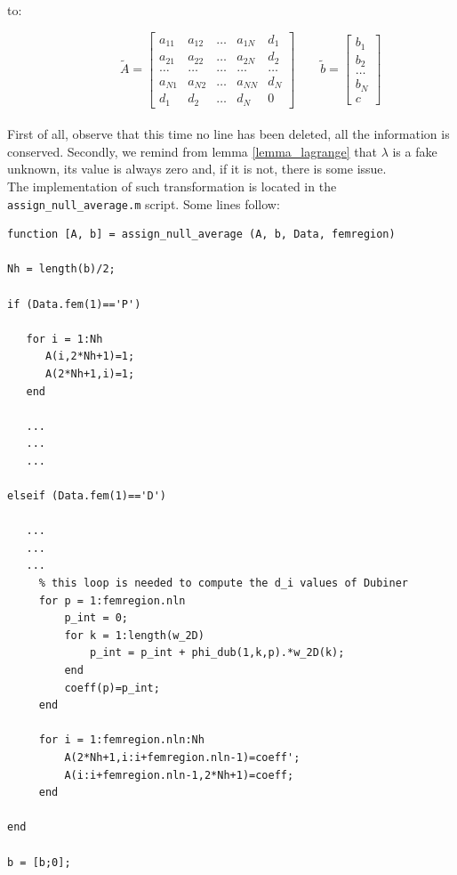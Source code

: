 \documentclass[a4paper,11pt]{article}
\begin{document}
to:

\begin{equation*}
\quad \quad  \quad \, \tilde{A}=\begin{bmatrix}
a_{11} & a_{12} & \dots & a_{1N} & d_1\\ 
a_{21} & a_{22} & \dots & a_{2N} & d_2 \\ 
\dots & \dots & \dots & \dots & \dots \\
a_{N1}  & a_{N2} & \dots & a_{NN} & d_N \\
d_1 & d_2 & \dots & d_N & 0
\end{bmatrix} \quad \quad
\tilde{b}=\begin{bmatrix}
b_1 \\ b_2 \\ \dots \\ b_N \\ c
\end{bmatrix}
\end{equation*}
\vspace{3mm} \\
\noindent First of all, observe that this time no line has been deleted, all the information is conserved. Secondly, we remind from lemma \ref{lemma_lagrange} that $\lambda$ is a fake unknown, its value is always zero and, if it is not, there is some issue. \\

\noindent The implementation of such transformation is located in the \texttt{assign\_null\_average.m} script. Some lines follow:

\begin{verbatim}
function [A, b] = assign_null_average (A, b, Data, femregion)

Nh = length(b)/2;

if (Data.fem(1)=='P')

   for i = 1:Nh
      A(i,2*Nh+1)=1;
      A(2*Nh+1,i)=1;
   end
   
   ...
   ...
   ...

elseif (Data.fem(1)=='D')

   ...
   ...
   ...
     % this loop is needed to compute the d_i values of Dubiner
     for p = 1:femregion.nln
         p_int = 0;
         for k = 1:length(w_2D)
             p_int = p_int + phi_dub(1,k,p).*w_2D(k);
         end
         coeff(p)=p_int;
     end

     for i = 1:femregion.nln:Nh
         A(2*Nh+1,i:i+femregion.nln-1)=coeff';
         A(i:i+femregion.nln-1,2*Nh+1)=coeff;
     end

end

b = [b;0];
\end{verbatim}
\end{document}
